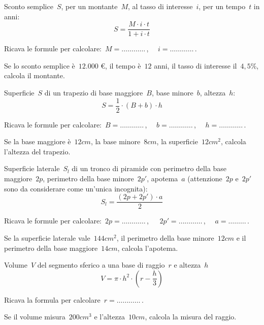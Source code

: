 \begin{esercizio}
\label{ese:20.56}
Sconto semplice~\(S\), per un montante~\(M\), al tasso di interesse~\(i\), per un 
tempo~\(t\) in anni:
\begin{equation*}
  S=\frac{M\cdot i\cdot t}{1+i\cdot t}
\end{equation*}

Ricava le formule per calcolare:~\(M=\ldots\ldots\ldots\ldots\)\,, \(\quad 
i=\ldots\ldots\ldots\ldots\)\,.

Se lo sconto semplice è~\(12.000\) €, il tempo è~\(12\) anni, il tasso di 
interesse il~\(4,5\%\), calcola il montante.
\end{esercizio}

\begin{esercizio}
\label{ese:20.57}
Superficie~\(S\) di un trapezio di base maggiore~\(B\), base minore~\(b\), 
altezza~\(h\):
\begin{equation*}
  S=\frac{1}{2}\cdot (B+b)\cdot h
\end{equation*}

Ricava le formule per calcolare:~\(B=\ldots\ldots\ldots\ldots\)\,, \(\quad 
b=\ldots\ldots\ldots\ldots\)\,, \(\quad h =\ldots\ldots\ldots\ldots\)\,.

Se la base maggiore è~\(12\unit{cm}\), la base minore~\(8\unit{cm}\), la 
superficie~\(12\unit{cm^2}\), calcola l'altezza del trapezio.
\end{esercizio}

\begin{esercizio}
\label{ese:20.58}
Superficie laterale~\(S_l\) di un tronco di piramide con perimetro della base 
maggiore~\(2p\), perimetro della base minore~\(2p'\), apotema~\(a\)
(attenzione~\(2p\) e~\(2p'\) sono da considerare come un'unica incognita):
\begin{equation*}
  S_{l}=\frac{(2p+2p')\cdot a}{2}
\end{equation*}

Ricava le formule per calcolare:~\(2p=\ldots\ldots\ldots\ldots\)\,, 
\(\quad~2p'=\ldots\ldots\ldots\ldots\)\,, \(\quad a =\ldots\ldots\ldots\)\,.

Se la superficie laterale vale~\(144\unit{cm^2}\), il perimetro della base 
minore~\(12\unit{cm}\) e il perimetro della base maggiore~\(14\unit{cm}\), 
calcola l'apotema.
\end{esercizio}

\begin{esercizio}
\label{ese:20.59}
Volume~\(V\) del segmento sferico a una base di raggio~\(r\) e altezza~\(h\)
\begin{equation*}
  V=\pi \cdot h^{2}\cdot \left(r-\frac{h}{3}\right)
\end{equation*}

Ricava la formula per calcolare~\(r=\ldots\ldots\ldots\ldots\)\,.

Se il volume misura~\(200\unit{cm^3}\) e l'altezza~\(10\unit{cm}\), calcola 
la misura del raggio.
\end{esercizio}


